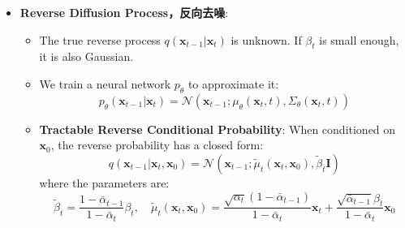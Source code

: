 \documentclass[UTF8]{ctexart}
\begin{document}
\begin{itemize}
    \item \textbf{Reverse Diffusion Process，反向去噪}:
    \begin{itemize}
        \item The true reverse process $q(\mathbf{x}_{t-1}|\mathbf{x}_t)$ is unknown. If $\beta_t$ is small enough, it is also Gaussian.
        \item We train a neural network $p_\theta$ to approximate it:
        $$p_\theta(\mathbf{x}_{t-1}|\mathbf{x}_t) = \mathcal{N}(\mathbf{x}_{t-1}; \mu_\theta(\mathbf{x}_t, t), \Sigma_\theta(\mathbf{x}_t, t))$$
        \item \textbf{Tractable Reverse Conditional Probability}: When conditioned on $\mathbf{x}_0$, the reverse probability has a closed form:
        $$q(\mathbf{x}_{t-1}|\mathbf{x}_t, \mathbf{x}_0) = \mathcal{N}(\mathbf{x}_{t-1}; \tilde{\mu}_t(\mathbf{x}_t, \mathbf{x}_0), \tilde{\beta}_t\mathbf{I})$$
        where the parameters are:
        $$\tilde{\beta}_t = \frac{1 - \bar{\alpha}_{t-1}}{1 - \bar{\alpha}_t}\beta_t, \quad \tilde{\mu}_t(\mathbf{x}_t, \mathbf{x}_0) = \frac{\sqrt{\alpha_t}(1 - \bar{\alpha}_{t-1})}{1 - \bar{\alpha}_t}\mathbf{x}_t + \frac{\sqrt{\bar{\alpha}_{t-1}}\beta_t}{1 - \bar{\alpha}_t}\mathbf{x}_0$$
    \end{itemize}


\end{itemize}
\end{document}
